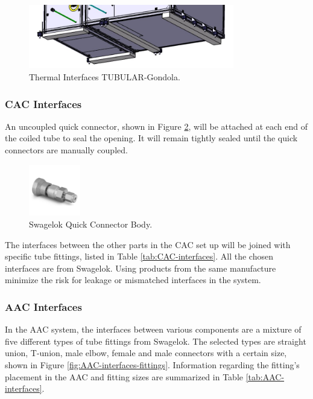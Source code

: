 \begin{figure}[H]
    \centering
    \includegraphics[width=0.8\textwidth]{4-experiment-design/img/Mechanical/thermal_interfaces.jpg}
    \caption{Thermal Interfaces TUBULAR-Gondola.}
    \label{fig:thermal_interface}
\end{figure}

\subsubsection{CAC Interfaces}
An uncoupled quick connector, shown in Figure \ref{fig:Quick-connector-body}, will be attached at each end of the coiled tube to seal the opening. It will remain tightly sealed until the quick connectors are manually coupled. 

\begin{figure}[H]
    \centering
    \includegraphics[width=0.2\textwidth]{4-experiment-design/img/Mechanical/CAC-QC-Outlet.jpg}
    \caption{Swagelok Quick Connector Body.}
    \label{fig:Quick-connector-body}
\end{figure}

The interfaces between the other parts in the CAC set up will be joined with specific tube fittings, listed in Table \ref{tab:CAC-interfaces}. All the chosen interfaces are from Swagelok. Using products from the same manufacture minimize the risk for leakage or mismatched interfaces in the system. 



\subsubsection{AAC Interfaces}
In the AAC system, the interfaces between various components are a mixture of five different types of tube fittings from Swagelok. The selected types are straight union, T-union, male elbow, female and male connectors with a certain  size, shown in Figure \ref{fig:AAC-interfaces-fittings}. Information regarding the fitting's placement in the AAC and fitting sizes are summarized in Table \ref{tab:AAC-interfaces}. 

